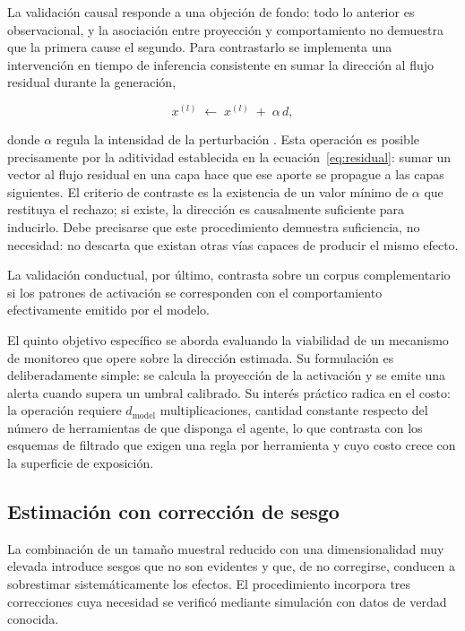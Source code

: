 La validación causal responde a una objeción de fondo: todo lo anterior es
observacional, y la asociación entre proyección y comportamiento no demuestra
que la primera cause el segundo. Para contrastarlo se implementa una
intervención en tiempo de inferencia consistente en sumar la dirección al flujo
residual durante la generación,

\begin{equation}
  x^{(l)} \;\longleftarrow\; x^{(l)} \;+\; \alpha\, d,
  \label{eq:intervencion}
\end{equation}

\noindent
donde $\alpha$ regula la intensidad de la perturbación \parencite{turner2023,zou2023}.
Esta operación es posible precisamente por la aditividad establecida en la
ecuación~\eqref{eq:residual}: sumar un vector al flujo residual en una capa hace
que ese aporte se propague a las capas siguientes. El criterio de contraste es
la existencia de un valor mínimo de $\alpha$ que restituya el rechazo; si
existe, la dirección es causalmente suficiente para inducirlo. Debe precisarse
que este procedimiento demuestra suficiencia, no necesidad: no descarta que
existan otras vías capaces de producir el mismo efecto.

La validación conductual, por último, contrasta sobre un corpus complementario
si los patrones de activación se corresponden con el comportamiento
efectivamente emitido por el modelo.

El quinto objetivo específico se aborda evaluando la viabilidad de un
mecanismo de monitoreo que opere sobre la dirección estimada. Su formulación es
deliberadamente simple: se calcula la proyección de la activación y se emite
una alerta cuando supera un umbral calibrado. Su interés práctico radica en el
costo: la operación requiere $d_{\text{model}}$ multiplicaciones, cantidad
constante respecto del número de herramientas de que disponga el agente, lo que
contrasta con los esquemas de filtrado que exigen una regla por herramienta y
cuyo costo crece con la superficie de exposición.

\subsection{Estimación con corrección de sesgo}

La combinación de un tamaño muestral reducido con una dimensionalidad muy
elevada introduce sesgos que no son evidentes y que, de no corregirse, conducen
a sobrestimar sistemáticamente los efectos. El procedimiento incorpora tres
correcciones cuya necesidad se verificó mediante simulación con datos de verdad
conocida.

